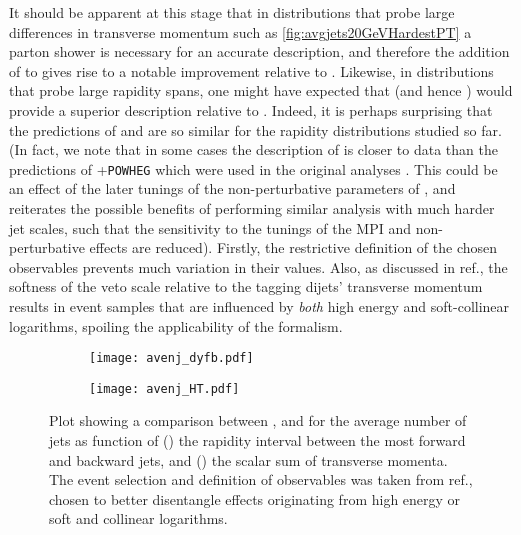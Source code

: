 It should be apparent at this stage that in distributions that probe large differences in transverse momentum such as 
\cref{fig:avgjets20GeVHardestPT}  a parton shower is necessary for an accurate description, and therefore the
addition of \py to \HEJ gives rise to a notable improvement relative to \HEJ. 
Likewise, in distributions that probe large rapidity spans, one might have expected that \HEJ (and hence \HEJpy)
would provide a superior description relative to \py. Indeed, it is perhaps surprising that the predictions of \HEJ and \py are so
similar for the rapidity distributions studied so far. 
(In fact, we note that in some cases the description of \py is closer to data
than the predictions of \pyt+\texttt{POWHEG}
\cite{Nason:2004rx,Frixione:2007vw,Alioli:2010xa} which were used in the
original analyses \cite{Aad:2011jz,Aad:2014pua}. This could be an effect of
the later tunings of the non-perturbative parameters of \pyt, and reiterates
the possible benefits of performing similar analysis with much harder jet
scales, such that the sensitivity to the tunings of the MPI and
non-perturbative effects are reduced).
Firstly, the restrictive definition of the chosen observables prevents much variation in 
their values. Also, as discussed in ref.\@  \cite{Alioli:2012tp}, the softness of the
veto scale relative to the tagging dijets' transverse momentum results in 
event samples that are influenced by \textit{both} high energy and soft-collinear logarithms,
spoiling the applicability of the \HEJ formalism. 

\begin{figure}[t]
  \centering
  \begin{subfigure}[t]{0.495\linewidth}
  \centering
   \texttt{[image: avenj\_dyfb.pdf]}
  \caption{}
  \label{fig:avejetspure_dyfb}
\end{subfigure}
  \begin{subfigure}[t]{0.495\linewidth}
    \centering
     \texttt{[image: avenj\_HT.pdf]}
    \caption{}
    \label{fig:avejetspure_HT}
\end{subfigure}  
\caption{Plot showing a comparison between \HEJ, \py and \HEJpy
for the average number of jets as function of () 
the rapidity interval between the most forward and backward jets, and ()
the scalar sum of transverse momenta. The event selection and definition of observables was taken 
from ref.\@  \cite{Alioli:2012tp}, chosen to better disentangle effects originating from high energy or soft and collinear logarithms.}
  \label{fig:avejetspure}
\end{figure}


